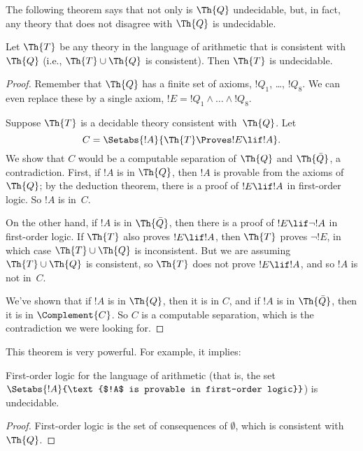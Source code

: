 \documentclass[../../../include/open-logic-section]{subfiles}
\begin{document}


The following theorem says that not only is $\Th{Q}$ undecidable, but, in
fact, any theory that does not disagree with $\Th{Q}$ is undecidable.

\begin{thm}
Let $\Th{T}$ be any theory in the language of arithmetic that is
consistent with $\Th{Q}$ (i.e., $\Th{T} \cup \Th{Q}$ is
consistent). Then $\Th{T}$ is undecidable.
\end{thm}

\begin{proof}
Remember that $\Th{Q}$ has a finite set of axioms, $!Q_1$, \dots,
$!Q_8$. We can even replace these by a single axiom, $!E = !Q_1 \land
\dots \land !Q_8$.

Suppose $\Th{T}$ is a decidable theory consistent with~$\Th{Q}$. Let
\[
C = \Setabs{!A}{\Th{T} \Proves !E \lif !A}.
\]
We show that $C$ would be a computable separation of $\Th{Q}$ and
$\Th{\bar Q}$, a contradiction. First, if $!A$ is in $\Th{Q}$, then
$!A$ is provable from the axioms of $\Th{Q}$; by the deduction
theorem, there is a proof of $!E \lif !A$ in first-order logic. So
$!A$ is in~$C$.

On the other hand, if $!A$ is in $\Th{\bar Q}$, then there is a proof
of $!E \lif \lnot !A$ in first-order logic. If $\Th{T}$ also proves
$!E \lif !A$, then $\Th{T}$ proves $\lnot !E$, in which case $\Th{T}
\cup \Th{Q}$ is inconsistent. But we are assuming $\Th{T} \cup \Th{Q}$
is consistent, so $\Th{T}$ does not prove $!E \lif !A$, and so $!A$
is not in~$C$.

We've shown that if $!A$ is in $\Th{Q}$, then it is in $C$, and if
$!A$ is in $\Th{\bar Q}$, then it is in $\Complement{C}$. So $C$ is a
computable separation, which is the contradiction we were looking for.
\end{proof}

This theorem is very powerful. For example, it implies:

\begin{cor}
  First-order logic for the language of arithmetic (that is, the set
  $\Setabs{!A}{\text{$!A$ is provable in first-order logic}}$) is
  undecidable.
\end{cor}

\begin{proof}
First-order logic is the set of consequences of $\emptyset$,
which is consistent with~$\Th{Q}$.
\end{proof}
\end{document}
